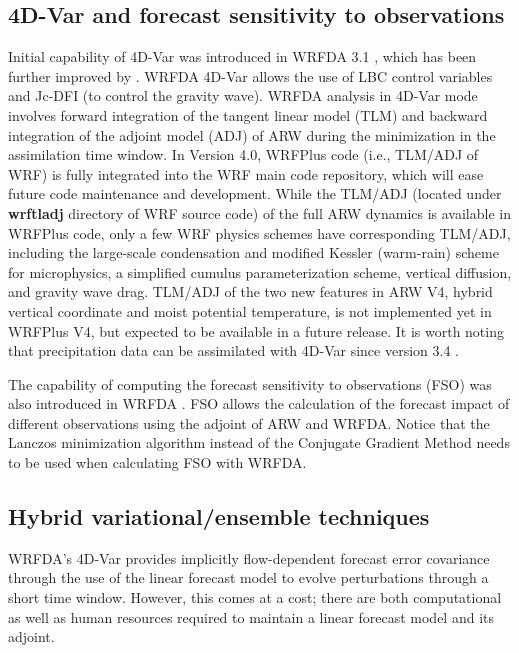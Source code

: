 \subsection{4D-Var and forecast sensitivity to observations}

Initial capability of 4D-Var was introduced in WRFDA 3.1 \citep{huang09}, which has been further
improved by \citet{zhang13, zhang14a}. WRFDA 4D-Var allows the use of LBC control variables and Jc-DFI 
(to control the gravity wave). WRFDA analysis in 4D-Var mode involves forward integration of the
tangent linear model (TLM) and backward integration of the adjoint model (ADJ) of ARW during the minimization in the assimilation time window. 
In Version 4.0, WRFPlus code (i.e., TLM/ADJ of WRF) is fully integrated into the WRF main code repository, 
which will ease future code maintenance
and development. While the TLM/ADJ (located under {\bf wrftladj} directory of WRF source code) of the full 
ARW dynamics is available in WRFPlus code, only a few WRF physics schemes have corresponding TLM/ADJ, including
the large-scale condensation and modified Kessler (warm-rain) \citep{wang13b} scheme for microphysics, a simplified
cumulus parameterization scheme, vertical diffusion, and gravity wave drag. TLM/ADJ of the two new features in ARW V4, 
hybrid vertical coordinate and moist potential temperature, is not implemented yet in WRFPlus V4, but expected to
be available in a future release.
It is worth noting that precipitation data can be assimilated with 4D-Var since version 3.4 \citep{ban17}.

The capability of computing the forecast sensitivity to observations (FSO) was also introduced in WRFDA \citep{zhang15}. 
FSO allows the calculation of the forecast impact of different observations using the adjoint of ARW and WRFDA. 
Notice that the Lanczos minimization algorithm instead of the Conjugate Gradient Method needs to be used when calculating FSO
with WRFDA.

\subsection{Hybrid variational/ensemble techniques}

WRFDA's 4D-Var provides implicitly flow-dependent forecast error covariance
through the use of the linear forecast model to evolve perturbations through a short time window. 
However, this comes at a cost; there are both computational as well as human resources
required to maintain a linear forecast model and its adjoint. 

